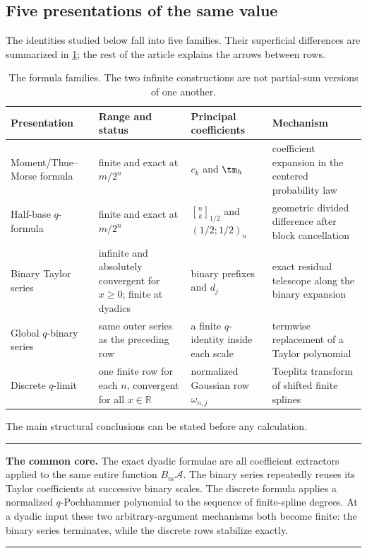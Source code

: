 \documentclass[11pt,oneside]{article}
\theoremstyle{definition}
\theoremstyle{remark}
\newcommand{\R}{\mathbb R}
\newcommand{\qbinom}[3]{\genfrac{[}{]}{0pt}{}{#1}{#2}_{#3}}
\newenvironment{boxedremark}{%
  \par\smallskip\noindent\begin{center}\begin{minipage}{0.94\textwidth}%
  \color{black}\hrule\vspace{0.6em}\small
}{%
  \vspace{0.6em}\hrule\end{minipage}\end{center}\smallskip
}
\begin{document}
\subsection{Five presentations of the same value}

The identities studied below fall into five families.  Their superficial differences are
summarized in \cref{dyadicweb:tab:formula-map}; the rest of the article explains the arrows between
rows.

\begin{table}[ht]
\centering
\small
\begin{tabularx}{\textwidth}{@{}>{\raggedright\arraybackslash}p{}
>{\raggedright\arraybackslash}p{}
>{\raggedright\arraybackslash}p{}X@{}}
\toprule
Presentation & Range and status & Principal coefficients & Mechanism \\
\midrule
Moment/Thue--Morse formula & finite and exact at $m/2^n$ & $c_k$ and $\tm_h$ & coefficient expansion in the centered probability law \\
Half-base $q$-formula & finite and exact at $m/2^n$ & $\qbinom nk{1/2}$ and $(1/2;1/2)_n$ & geometric divided difference after block cancellation \\
Binary Taylor series & infinite and absolutely convergent for $x\ge0$; finite at dyadics & binary prefixes and $d_j$ & exact residual telescope along the binary expansion \\
Global $q$-binary series & same outer series as the preceding row & a finite $q$-identity inside each scale & termwise replacement of a Taylor polynomial \\
Discrete $q$-limit & one finite row for each $n$, convergent for all $x\in\R$ & normalized Gaussian row $\omega_{n,j}$ & Toeplitz transform of shifted finite splines \\
\bottomrule
\end{tabularx}
\caption{The formula families.  The two infinite constructions are not partial-sum versions
of one another.}
\label{dyadicweb:tab:formula-map}
\end{table}

The main structural conclusions can be stated before any calculation.

\begin{boxedremark}
\textbf{The common core.}
The exact dyadic formulae are all coefficient extractors applied to the same entire function
$B_m\mathscr A$.  The binary series repeatedly reuses its Taylor coefficients at successive
binary scales.  The discrete formula applies a normalized $q$-Pochhammer polynomial to the
sequence of finite-spline degrees.  At a dyadic input these two arbitrary-argument mechanisms
both become finite: the binary series terminates, while the discrete rows stabilize exactly.
\end{boxedremark}
\end{document}
